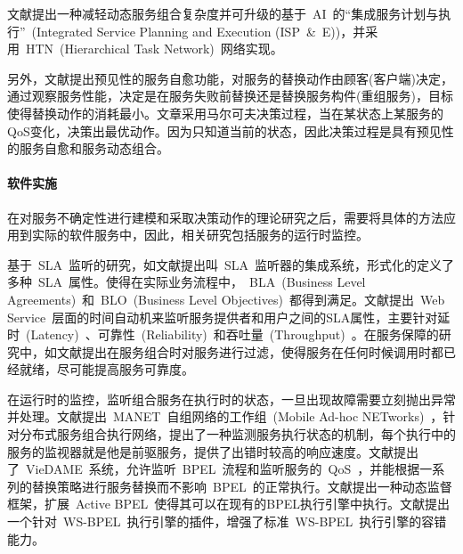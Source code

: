 文献\cite{madhusudan2006declarative}提出一种减轻动态服务组合复杂度并可升级的基于~AI~的“集成服务计划与执行”~(Integrated Service Planning and Execution (ISP~\&~E))，并采用~HTN~(Hierarchical Task Network)~网络实现。

另外，文献\cite{pillai2009optimal}提出预见性的服务自愈功能，对服务的替换动作由顾客(客户端)决定，通过观察服务性能，决定是在服务失败前替换还是替换服务构件(重组服务)，目标使得替换动作的消耗最小。文章采用马尔可夫决策过程，当在某状态上某服务的QoS变化，决策出最优动作。因为只知道当前的状态，因此决策过程是具有预见性的服务自愈和服务动态组合。

\paragraph{软件实施}

在对服务不确定性进行建模和采取决策动作的理论研究之后，需要将具体的方法应用到实际的软件服务中，因此，相关研究包括服务的运行时监控。

基于~SLA~监听的研究，如文献\cite{goel2011sla}提出叫~SLA~监听器的集成系统，形式化的定义了多种~SLA~属性。使得在实际业务流程中，~BLA~(Business Level Agreements)~和~BLO~(Business Level Objectives)~都得到满足。文献\cite{raimondi2008efficient}提出~Web Service~层面的时间自动机来监听服务提供者和用户之间的SLA属性，主要针对延时~(Latency)~、可靠性~(Reliability)~和吞吐量~(Throughput)~。在服务保障的研究中，如文献\cite{bravetti2007theory}\cite{bravetti2009theory}提出在服务组合时对服务进行过滤，使得服务在任何时候调用时都已经就绪，尽可能提高服务可靠度。

在运行时的监控，监听组合服务在执行时的状态，一旦出现故障需要立刻抛出异常并处理。文献\cite{chen2008dynamic}提出~MANET~自组网络的工作组~(Mobile Ad-hoc NETworks)~，针对分布式服务组合执行网络，提出了一种监测服务执行状态的机制，每个执行中的服务的监视器就是他是前驱服务，提供了出错时较高的响应速度。文献\cite{moser2008non}提出了~VieDAME~系统，允许监听~BPEL~流程和监听服务的~QoS~，并能根据一系列的替换策略进行服务替换而不影响~BPEL~的正常执行。文献\cite{baresi2005dynamo}提出一种动态监督框架，扩展~Active BPEL~使得其可以在现有的BPEL执行引擎中执行。文献\cite{modafferi2006sh}提出一个针对~WS-BPEL~执行引擎的插件，增强了标准~WS-BPEL~执行引擎的容错能力。

